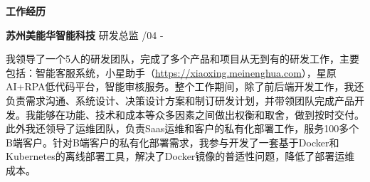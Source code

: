 \documentclass[a4paper]{article}
\newenvironment{changemargin}[2]{%
  \begin{list}{}{%
    \setlength{\topsep}{0pt}%
    \setlength{\leftmargin}{#1}%
    \setlength{\rightmargin}{#2}%
    \setlength{\listparindent}{\parindent}%
    \setlength{\itemindent}{\parindent}%
    \setlength{\parsep}{\parskip}%
  }%
  \item[]}{\end{list}
}
\newcommand{\lineover}{
	\begin{changemargin}{-0.05in}{-0.05in}
		\vspace*{-8pt}
		\hrulefill \\
		\vspace*{-2pt}
	\end{changemargin}
}
\newcommand{\header}[1]{
	\begin{changemargin}{-0.5in}{-0.5in}
	\fontsize{12}{14} \scshape{\textbf{#1}}\\
	\end{changemargin}
}
\newenvironment{body} {
	\vspace*{-16pt}
	\begin{changemargin}{-0.5in}{-0.5in}
  }	
	{\end{changemargin}
}
\begin{document}
\header{工作经历}
\begin{body}
	\vspace{14pt}
	\textbf{苏州美能华智能科技} \hfill 研发总监 {/04 - }\\
	\smallskip
	\begin{justify}
	我领导了一个5人的研发团队，完成了多个产品和项目从无到有的研发工作，主要包括：智能客服系统，小星助手（\url{https://xiaoxing.meinenghua.com}），星原AI+RPA低代码平台，智能审核服务。整个工作期间，除了前后端开发工作，我还负责需求沟通、系统设计、决策设计方案和制订研发计划，并带领团队完成产品开发。我能够在功能、技术和成本等众多因素之间做出权衡和取舍，做到按时交付。
	此外我还领导了运维团队，负责Saas运维和客户的私有化部署工作，服务100多个B端客户。针对B端客户的私有化部署需求，我参与开发了一套基于Docker和Kubernetes的离线部署工具，解决了Docker镜像的普适性问题，降低了部署运维成本。
	\end{justify}

\end{body}
\end{document}
